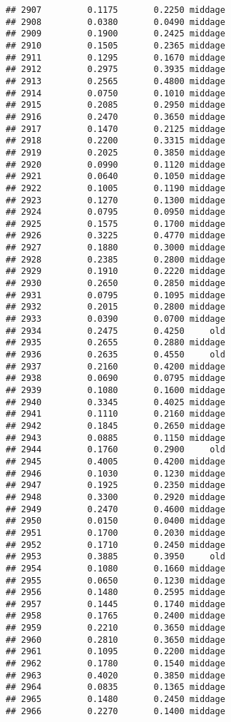 \documentclass[
]{article}
\begin{document}
\begin{verbatim}
## 2907         0.1175       0.2250 middage
## 2908         0.0380       0.0490 middage
## 2909         0.1900       0.2425 middage
## 2910         0.1505       0.2365 middage
## 2911         0.1295       0.1670 middage
## 2912         0.2975       0.3935 middage
## 2913         0.2565       0.4800 middage
## 2914         0.0750       0.1010 middage
## 2915         0.2085       0.2950 middage
## 2916         0.2470       0.3650 middage
## 2917         0.1470       0.2125 middage
## 2918         0.2200       0.3315 middage
## 2919         0.2025       0.3850 middage
## 2920         0.0990       0.1120 middage
## 2921         0.0640       0.1050 middage
## 2922         0.1005       0.1190 middage
## 2923         0.1270       0.1300 middage
## 2924         0.0795       0.0950 middage
## 2925         0.1575       0.1700 middage
## 2926         0.3225       0.4770 middage
## 2927         0.1880       0.3000 middage
## 2928         0.2385       0.2800 middage
## 2929         0.1910       0.2220 middage
## 2930         0.2650       0.2850 middage
## 2931         0.0795       0.1095 middage
## 2932         0.2015       0.2800 middage
## 2933         0.0390       0.0700 middage
## 2934         0.2475       0.4250     old
## 2935         0.2655       0.2880 middage
## 2936         0.2635       0.4550     old
## 2937         0.2160       0.4200 middage
## 2938         0.0690       0.0795 middage
## 2939         0.1080       0.1600 middage
## 2940         0.3345       0.4025 middage
## 2941         0.1110       0.2160 middage
## 2942         0.1845       0.2650 middage
## 2943         0.0885       0.1150 middage
## 2944         0.1760       0.2900     old
## 2945         0.4005       0.4200 middage
## 2946         0.1030       0.1230 middage
## 2947         0.1925       0.2350 middage
## 2948         0.3300       0.2920 middage
## 2949         0.2470       0.4600 middage
## 2950         0.0150       0.0400 middage
## 2951         0.1700       0.2030 middage
## 2952         0.1710       0.2450 middage
## 2953         0.3885       0.3950     old
## 2954         0.1080       0.1660 middage
## 2955         0.0650       0.1230 middage
## 2956         0.1480       0.2595 middage
## 2957         0.1445       0.1740 middage
## 2958         0.1765       0.2400 middage
## 2959         0.2210       0.3650 middage
## 2960         0.2810       0.3650 middage
## 2961         0.1095       0.2200 middage
## 2962         0.1780       0.1540 middage
## 2963         0.4020       0.3850 middage
## 2964         0.0835       0.1365 middage
## 2965         0.1480       0.2450 middage
## 2966         0.2270       0.1400 middage

\end{verbatim}
\end{document}

